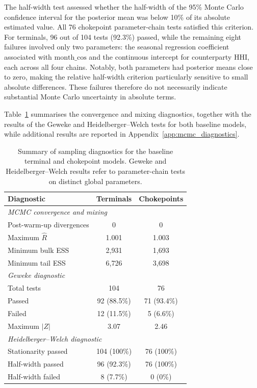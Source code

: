\documentclass[pdftex,12pt,openright,a4paper,oneside]{book}
\begin{document}
The half-width test assessed whether
the half-width of the 95\% Monte Carlo
confidence interval for the posterior
mean was below 10\% of its absolute
estimated value.
All 76 chokepoint parameter-chain tests satisfied
this criterion. For terminals,
96 out of 104 tests (92.3\%)
passed, while the remaining eight
failures involved only two parameters:
the seasonal regression coefficient
associated with $\mathrm{month\_cos}$
and the continuous intercept for
counterparty HHI, each across all
four chains.
Notably, both parameters had posterior means
close to zero, making the relative
half-width criterion particularly
sensitive to small absolute differences.
These failures therefore do not
necessarily indicate substantial
Monte Carlo uncertainty in absolute
terms.

Table~\ref{tab:baseline_sampling_diagnostics} summarises the convergence and mixing diagnostics, 
together with the results of the Geweke and Heidelberger--Welch tests for both baseline models,
while additional results are reported in Appendix~\ref{app:mcmc_diagnostics}.

\begin{table}[htbp]
\centering
\caption{Summary of sampling diagnostics for the
baseline terminal and chokepoint models.
Geweke and Heidelberger--Welch results refer
to parameter-chain tests on distinct global parameters.}
\label{tab:baseline_sampling_diagnostics}
\small
\begin{tabular}{lcc}
\hline
Diagnostic & Terminals & Chokepoints \\
\hline
\multicolumn{3}{l}{\textit{MCMC convergence and mixing}} \\
Post-warm-up divergences & 0 & 0 \\
Maximum $\widehat{R}$ & 1.001 & 1.003 \\
Minimum bulk ESS & 2,931 & 1,693 \\
Minimum tail ESS & 6,726 & 3,698 \\
\hline
\multicolumn{3}{l}{\textit{Geweke diagnostic}} \\
Total tests & 104 & 76 \\
Passed & 92 (88.5\%) & 71 (93.4\%) \\
Failed & 12 (11.5\%) & 5 (6.6\%) \\
Maximum $|Z|$ & 3.07 & 2.46 \\
\hline
\multicolumn{3}{l}{\textit{Heidelberger--Welch diagnostic}} \\
Stationarity passed & 104 (100\%) & 76 (100\%) \\
Half-width passed & 96 (92.3\%) & 76 (100\%) \\
Half-width failed & 8 (7.7\%) & 0 (0\%) \\
\hline
\end{tabular}
\end{table}
\end{document}
